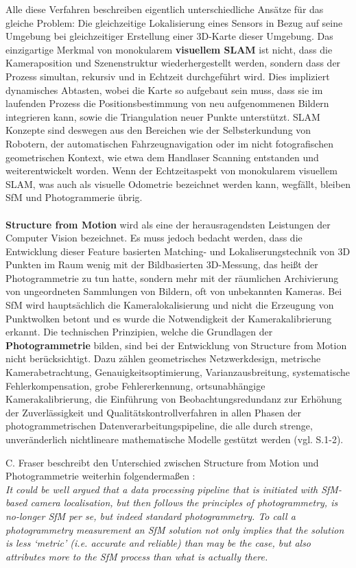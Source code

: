 Alle diese Verfahren beschreiben eigentlich unterschiedliche Ansätze für das gleiche Problem: Die gleichzeitige Lokalisierung eines Sensors in Bezug auf seine Umgebung bei gleichzeitiger Erstellung einer 3D-Karte dieser Umgebung. Das einzigartige Merkmal von monokularem \textbf{visuellem SLAM} ist nicht, dass die Kameraposition und Szenenstruktur wiederhergestellt werden, sondern dass der Prozess simultan, rekursiv und in Echtzeit durchgeführt wird. Dies impliziert dynamisches Abtasten, wobei die Karte so aufgebaut sein muss, dass sie im laufenden Prozess die Positionsbestimmung von neu aufgenommenen Bildern integrieren kann, sowie die Triangulation neuer Punkte unterstützt. SLAM Konzepte sind deswegen aus den Bereichen wie der Selbsterkundung von Robotern, der automatischen Fahrzeugnavigation oder im nicht fotografischen geometrischen Kontext, wie etwa dem Handlaser Scanning entstanden und weiterentwickelt worden. Wenn der Echtzeitaspekt von monokularem visuellem SLAM, was auch als visuelle Odometrie bezeichnet werden kann, wegfällt, bleiben SfM und Photogrammerie übrig. \\ \\ \textbf{Structure from Motion} wird als eine der herausragendsten Leistungen der Computer Vision bezeichnet. Es muss jedoch bedacht werden, dass die Entwicklung dieser Feature basierten Matching- und Lokaliserungstechnik von 3D Punkten im Raum wenig mit der Bildbasierten 3D-Messung, das heißt der Photogrammetrie zu tun hatte, sondern mehr mit der räumlichen Archivierung von ungeordneten Sammlungen von Bildern, oft von unbekannten Kameras. Bei SfM wird hauptsächlich die Kameralokalisierung und nicht die Erzeugung von Punktwolken betont und es wurde die Notwendigkeit der Kamerakalibrierung erkannt. Die technischen Prinzipien, welche die Grundlagen der \textbf{Photogrammetrie} bilden, sind bei der Entwicklung von Structure from Motion nicht berücksichtigt. Dazu zählen geometrisches Netzwerkdesign, metrische Kamerabetrachtung, Genauigkeitsoptimierung, Varianzausbreitung, systematische Fehlerkompensation, grobe Fehlererkennung, ortsunabhängige Kamerakalibrierung, die Einführung von Beobachtungsredundanz zur Erhöhung der Zuverlässigkeit und Qualitätskontrollverfahren in allen Phasen der photogrammetrischen Datenverarbeitungspipeline, die alle durch strenge, unveränderlich nichtlineare mathematische Modelle gestützt werden (vgl. \cite{vergleich_fraser} S.1-2).

C. Fraser beschreibt den Unterschied zwischen Structure from Motion und Photogrammetrie weiterhin folgendermaßen \cite{vergleich_fraser}: \\ \textit{ \glqq It could be well argued that a data processing pipeline that is initiated with SfM-based camera localisation, but then follows the principles of photogrammetry, is no-longer SfM per se, but indeed standard photogrammetry. To call a photogrammetry measurement an SfM solution not only implies that the solution is less ‘metric’ (i.e. accurate and reliable) than may be the case, but also attributes more to the SfM process than what is actually there.\grqq }

